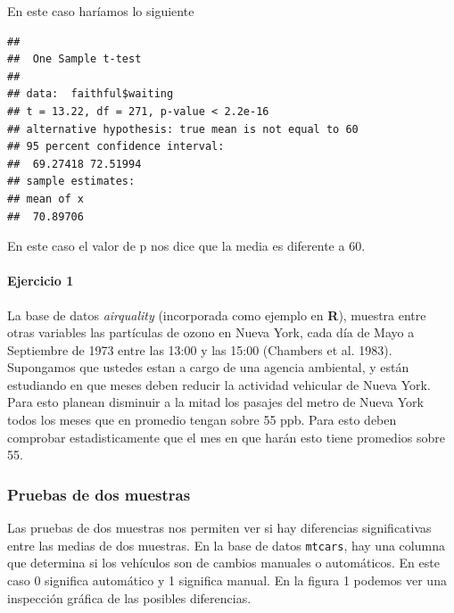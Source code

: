 \documentclass[]{article}
\newenvironment{Shaded}{\begin{snugshade}}{\end{snugshade}}
\newcommand{\KeywordTok}[1]{\textcolor[rgb]{0.13,0.29,0.53}{\textbf{#1}}}
\newcommand{\DataTypeTok}[1]{\textcolor[rgb]{0.13,0.29,0.53}{#1}}
\newcommand{\DecValTok}[1]{\textcolor[rgb]{0.00,0.00,0.81}{#1}}
\newcommand{\StringTok}[1]{\textcolor[rgb]{0.31,0.60,0.02}{#1}}
\newcommand{\OperatorTok}[1]{\textcolor[rgb]{0.81,0.36,0.00}{\textbf{#1}}}
\newcommand{\NormalTok}[1]{#1}
\let\oldparagraph\paragraph
\renewcommand{\paragraph}[1]{\oldparagraph{#1}\mbox{}}
\begin{document}
En este caso haríamos lo siguiente

\begin{Shaded}
\end{Shaded}

\begin{verbatim}
## 
##  One Sample t-test
## 
## data:  faithful$waiting
## t = 13.22, df = 271, p-value < 2.2e-16
## alternative hypothesis: true mean is not equal to 60
## 95 percent confidence interval:
##  69.27418 72.51994
## sample estimates:
## mean of x 
##  70.89706
\end{verbatim}

En este caso el valor de p nos dice que la media es diferente a 60.

\paragraph{Ejercicio 1}\label{ejercicio-1}

La base de datos \emph{airquality} (incorporada como ejemplo en
\textbf{R}), muestra entre otras variables las partículas de ozono en
Nueva York, cada día de Mayo a Septiembre de 1973 entre las 13:00 y las
15:00 (Chambers et al. 1983). Supongamos que ustedes estan a cargo de
una agencia ambiental, y están estudiando en que meses deben reducir la
actividad vehicular de Nueva York. Para esto planean disminuir a la
mitad los pasajes del metro de Nueva York todos los meses que en
promedio tengan sobre 55 ppb. Para esto deben comprobar estadisticamente
que el mes en que harán esto tiene promedios sobre 55.

\subsubsection{Pruebas de dos muestras}\label{pruebas-de-dos-muestras}

Las pruebas de dos muestras nos permiten ver si hay diferencias
significativas entre las medias de dos muestras. En la base de datos
\texttt{mtcars}, hay una columna que determina si los vehículos son de
cambios manuales o automáticos. En este caso 0 significa automático y 1
significa manual. En la figura 1 podemos ver una inspección gráfica de
las posibles diferencias.
\end{document}
